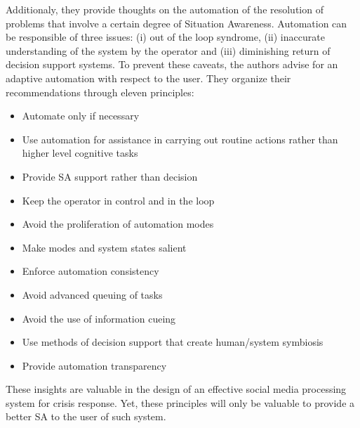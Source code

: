 Additionaly, they provide thoughts on the automation of the resolution of problems that involve a certain degree of Situation Awareness.
Automation can be responsible of three issues: (i) out of the loop syndrome, (ii) inaccurate understanding of the system by the operator and (iii) diminishing return of decision support systems.
To prevent these caveats, the authors advise for an adaptive automation with respect to the user.
They organize their recommendations through eleven principles:

\begin{itemize}
    \item Automate only if necessary
    \item Use automation for assistance in carrying out routine actions rather than higher level cognitive tasks
    \item Provide SA support rather than decision
    \item Keep the operator in control and in the loop
    \item Avoid the proliferation of automation modes
    \item Make modes and system states salient
    \item Enforce automation consistency
    \item Avoid advanced queuing of tasks
    \item Avoid the use of information cueing
    \item Use methods of decision support that create human/system symbiosis
    \item Provide automation transparency
\end{itemize}

These insights are valuable in the design of an effective social media processing system for crisis response.
Yet, these principles will only be valuable to provide a better SA to the user of such system.

